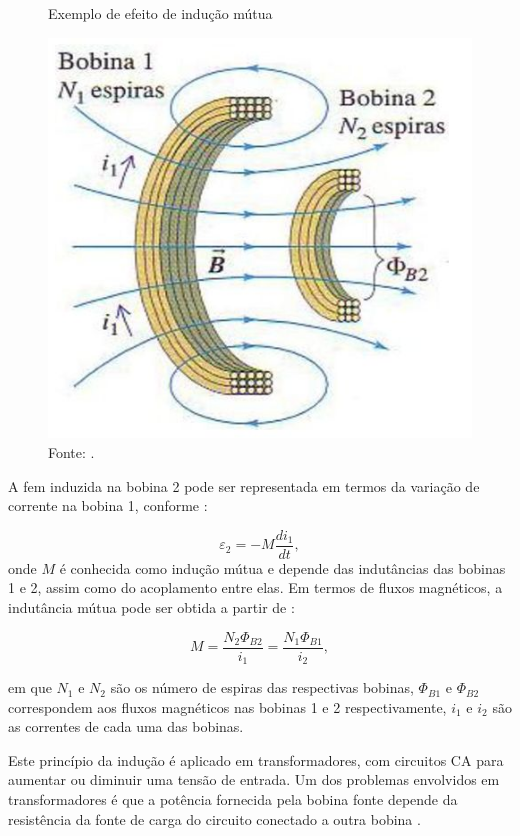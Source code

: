 \begin{figure}[H]
	\vspace{4mm}
  \centering
  \caption{Exemplo de efeito de indução mútua}
  \label{fig:Duasbob}
  \includegraphics[scale=0.3]{imagens/InducaoMutua.png}
  \caption*{Fonte: .}
\end{figure}


  A fem induzida na bobina 2 pode ser representada em termos da variação de corrente na bobina 1, conforme \cite{Young}:

\begin{equation}
  \varepsilon_2 = -M \frac{di_1}{dt},
  \label{eq:variacao}
\end{equation}
 onde $M$ é conhecida como indução mútua e depende das indutâncias das bobinas 1 e 2, assim como do acoplamento entre elas. Em 
termos de fluxos magnéticos, a indutância mútua pode ser obtida a partir de \cite{Young}:

\begin{equation}
  M =\frac{ N_2 \Phi_{B2}}{i_1} =  \frac{N_1\Phi_{B1}}{i_2},
 \label{eq:indutanciaMutua}
\end{equation}

em que $N_1$ e $N_2$ são os número de espiras das respectivas bobinas, $\Phi_{B1}$ e $\Phi_{B2}$ correspondem aos fluxos magnéticos nas bobinas 1 e 2 respectivamente, $i_1$ e $i_2$ são as correntes de cada uma das bobinas. 

Este princípio da indução é aplicado em transformadores, com circuitos CA para aumentar ou diminuir uma tensão de entrada. Um dos 
problemas 
envolvidos em transformadores é que a potência fornecida pela bobina fonte depende da resistência da fonte de carga do circuito 
conectado a outra bobina \cite{Young}.

